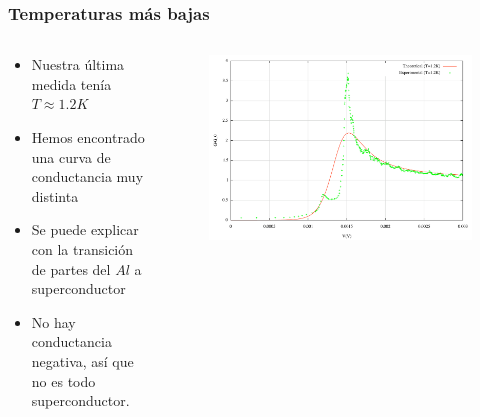 \frame
{
  \frametitle{Temperaturas m\'as bajas}
    \begin{columns}
\begin{column}{0.6\textwidth}
     \begin{itemize}
      \item<1-> Nuestra \'ultima medida ten\'ia $T\approx 1.2K$
      \item<2-> Hemos encontrado una curva de conductancia muy distinta
      \item<3-> Se puede explicar con la transici\'on de partes del $Al$ a superconductor
      \item<4-> No hay conductancia negativa, as\'i que no es todo superconductor.
     \end{itemize}
     
       \end{column}
\begin{column}{0.4\textwidth}
	\begin{figure}[!h] \label{sample}
	\includegraphics[width=\textwidth]{gv_theo_exp_10}
	\end{figure}
\end{column}
\end{columns} 

 }

